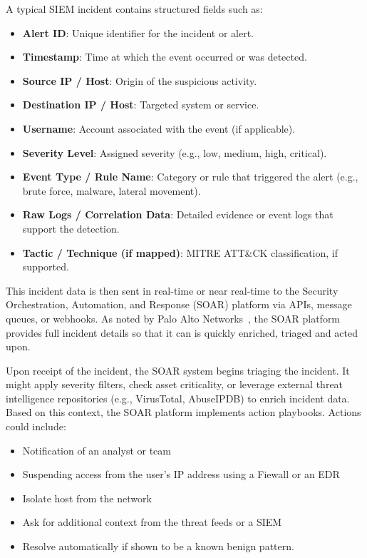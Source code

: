 A typical SIEM incident contains structured fields such as:

\begin{itemize}[itemsep=0pt,parsep=0pt,topsep=0pt,partopsep=0pt]
    \item \textbf{Alert ID}: Unique identifier for the incident or alert.
    \item \textbf{Timestamp}: Time at which the event occurred or was detected.
    \item \textbf{Source IP / Host}: Origin of the suspicious activity.
    \item \textbf{Destination IP / Host}: Targeted system or service.
    \item \textbf{Username}: Account associated with the event (if applicable).
    \item \textbf{Severity Level}: Assigned severity (e.g., low, medium, high, critical).
    \item \textbf{Event Type / Rule Name}: Category or rule that triggered the alert (e.g., brute force, malware, lateral movement).
    \item \textbf{Raw Logs / Correlation Data}: Detailed evidence or event logs that support the detection.
    \item \textbf{Tactic / Technique (if mapped)}: MITRE ATT\&CK classification, if supported.
\end{itemize}

This incident data is then sent in real-time or near real-time to the Security Orchestration, Automation, and Response (SOAR) platform via APIs, message queues, or webhooks. As noted by Palo Alto Networks~\cite{paloalto}, the SOAR platform provides full incident details so that it can is quickly enriched, triaged and acted upon.

Upon receipt of the incident, the SOAR system begins triaging the incident. It might apply severity filters, check asset criticality, or leverage external threat intelligence repositories (e.g., VirusTotal, AbuseIPDB) to enrich incident data. Based on this context, the SOAR platform implements action playbooks. Actions could include:

\begin{itemize}[itemsep=0pt,parsep=0pt,topsep=0pt,partopsep=0pt]
    \item Notification of an analyst or team
    \item Suspending access from the user's IP address using a Fiewall or an EDR
    \item Isolate host from the network
    \item Ask for additional context from the threat feeds or a SIEM
    \item Resolve automatically if shown to be a known benign pattern.
\end{itemize}

